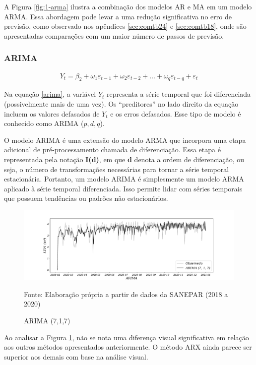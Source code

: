 A Figura \ref{fig:1-arma} ilustra a combinação dos modelos AR e MA em um modelo ARMA. Essa abordagem pode levar a uma redução significativa no erro de previsão, como observado nos apêndices \ref{sec:comtb24} e \ref{sec:comtb18}, onde são apresentadas comparações com um maior número de passos de previsão.

\subsubsection{ARIMA}

\begin{eqnarray}
	Y_t = \beta_2 + \omega_1\varepsilon_{t-1} + \omega_2 \varepsilon_{t-2} +\ldots+ \omega_q \varepsilon_{t-q} + \varepsilon_t \label{arima}
\end{eqnarray}

Na equação \eqref{arima}, a variável $Y_t$ representa a série temporal que foi diferenciada (possivelmente mais de uma vez). Os ``preditores'' no lado direito da equação incluem os valores defasados de $Y_t$ e os erros defasados. Esse tipo de modelo é conhecido como ARIMA ($p, d, q$).

O modelo ARIMA é uma extensão do modelo ARMA que incorpora uma etapa adicional de pré-processamento chamada de diferenciação. Essa etapa é representada pela notação \textbf{I(d)}, em que \textbf{d} denota a ordem de diferenciação, ou seja, o número de transformações necessárias para tornar a série temporal estacionária. Portanto, um modelo ARIMA é simplesmente um modelo ARMA aplicado à série temporal diferenciada. Isso permite lidar com séries temporais que possuem tendências ou padrões não estacionários.

\begin{figure}[htpb!]
	\centering
	\caption{ARIMA (7,1,7)}
	\label{fig:1-arima}
	\includegraphics[width=1\linewidth]{Modelos/Figuras/ARIMA}
	
	Fonte: Elaboração própria a partir de dados da SANEPAR (2018 a 2020)
\end{figure}

Ao analisar a Figura \ref{fig:1-arima}, não se nota uma diferença visual significativa em relação aos outros métodos apresentados anteriormente. O método ARX ainda parece ser superior aos demais com base na análise visual.

